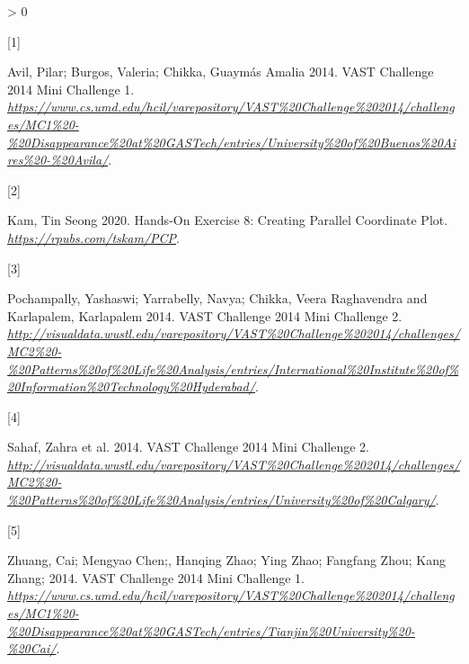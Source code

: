 \documentclass{acm_proc_article-sp}
\newlength{\csllabelwidth}
\newlength{\cslhangindent}
\newenvironment{CSLReferences}[2] %
 {%
  \setlength{\parindent}{0pt}
  \ifodd #1 \everypar{\setlength{\hangindent}{\cslhangindent}}\ignorespaces\fi
  \ifnum #2 > 0
  \setlength{\parskip}{#2\baselineskip}
  \fi
 }%
 {}
\newcommand{\CSLLeftMargin}[1]{\parbox[t]{\csllabelwidth}{#1}}
\newcommand{\CSLRightInline}[1]{\parbox[t]{\linewidth - \csllabelwidth}{#1}\break}
\begin{document}
\hypertarget{refs}{}
\begin{CSLReferences}{0}{0}
\leavevmode\hypertarget{ref-Avil}{}%
\CSLLeftMargin{{[}1{]} }
\CSLRightInline{Avil, Pilar; Burgos, Valeria; Chikka, Guaymás Amalia
2014. VAST Challenge 2014 Mini Challenge 1.
\emph{\url{https://www.cs.umd.edu/hcil/varepository/VAST\%20Challenge\%202014/challenges/MC1\%20-\%20Disappearance\%20at\%20GASTech/entries/University\%20of\%20Buenos\%20Aires\%20-\%20Avila/}}.}

\leavevmode\hypertarget{ref-profkam}{}%
\CSLLeftMargin{{[}2{]} }
\CSLRightInline{Kam, Tin Seong 2020. Hands-On Exercise 8: Creating
Parallel Coordinate Plot. \emph{\url{https://rpubs.com/tskam/PCP}}.}

\leavevmode\hypertarget{ref-IIITH}{}%
\CSLLeftMargin{{[}3{]} }
\CSLRightInline{Pochampally, Yashaswi; Yarrabelly, Navya; Chikka, Veera
Raghavendra and Karlapalem, Karlapalem 2014. VAST Challenge 2014 Mini
Challenge 2.
\emph{\url{http://visualdata.wustl.edu/varepository/VAST\%20Challenge\%202014/challenges/MC2\%20-\%20Patterns\%20of\%20Life\%20Analysis/entries/International\%20Institute\%20of\%20Information\%20Technology\%20Hyderabad/}}.}

\leavevmode\hypertarget{ref-UC}{}%
\CSLLeftMargin{{[}4{]} }
\CSLRightInline{Sahaf, Zahra et al. 2014. VAST Challenge 2014 Mini
Challenge 2.
\emph{\url{http://visualdata.wustl.edu/varepository/VAST\%20Challenge\%202014/challenges/MC2\%20-\%20Patterns\%20of\%20Life\%20Analysis/entries/University\%20of\%20Calgary/}}.}

\leavevmode\hypertarget{ref-Zhuang}{}%
\CSLLeftMargin{{[}5{]} }
\CSLRightInline{Zhuang, Cai; Mengyao Chen;, Hanqing Zhao; Ying Zhao;
Fangfang Zhou; Kang Zhang; 2014. VAST Challenge 2014 Mini Challenge 1.
\emph{\url{https://www.cs.umd.edu/hcil/varepository/VAST\%20Challenge\%202014/challenges/MC1\%20-\%20Disappearance\%20at\%20GASTech/entries/Tianjin\%20University\%20-\%20Cai/}}.}

\end{CSLReferences}
\setlength{\parindent}{0in}
\end{document}
